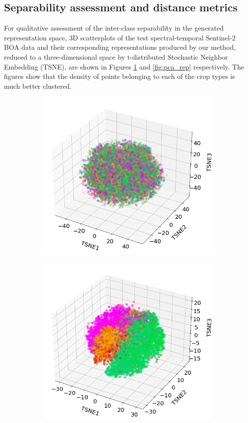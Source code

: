 \documentclass[journal,article,submit,pdftex,moreauthors]{Definitions/mdpi}
\begin{document}
\subsection{Separability assessment and distance metrics}
For qualitative assessment of the inter-class separability in the generated representation space, 3D scatterplots of the test spectral-temporal Sentinel-2 \ac{BOA} data and their corresponding representations produced by our method, reduced to a three-dimensional space by t-distributed Stochastic Neighbor Embedding (TSNE), are shown in Figures \ref{fig:pca_raw} and \ref{fig:pca_rep} respectively.
The figures show that the density of points belonging to each of the crop types is much better clustered.
\begin{figure}[H]
	\centering
	\begin{subfigure}[t]{0.35\linewidth}
		\centering
		\includegraphics[width=0.9\linewidth]{figures/aes_1_layer_mse_results/s2_TSNE_v3.png}
		\caption{}
	  \label{fig:pca_raw}
	\end{subfigure}
	\begin{subfigure}[t]{0.35\linewidth}
		\centering
		\includegraphics[width=0.9\linewidth]{figures/aes_1_layer_mse_results/representations_TSNE_v5.png}

\end{subfigure}
\end{figure}
\end{document}
